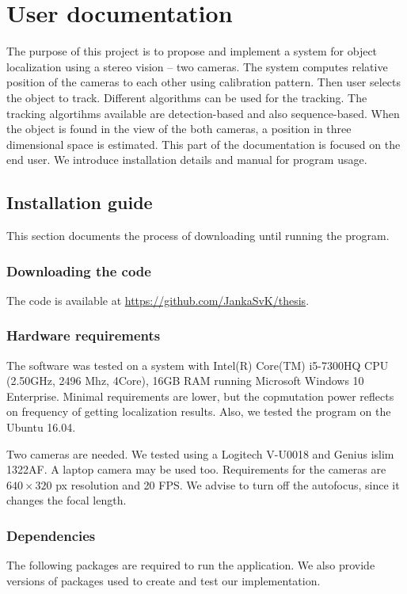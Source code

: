 \chapter{User documentation}
The purpose of this project is to propose and implement a system for object
localization using a stereo vision -- two cameras. The system computes relative
position of the cameras to each other using calibration pattern.  Then user
selects the object to track. Different algorithms can be used for the tracking.
The tracking algortihms available are detection-based and also sequence-based.
When the object is found in the view of the both cameras, a position in three
dimensional space is estimated. 
This part of the documentation is focused on the end user. We introduce
installation details and manual for program usage.

\section{Installation guide}
This section documents the process of downloading until running the program.

\subsection{Downloading the code}
The code is available at \url{https://github.com/JankaSvK/thesis}.

\subsection{Hardware requirements}
The software was tested on a system with Intel(R) Core(TM) i5-7300HQ CPU
(2.50GHz, 2496 Mhz, 4Core), 16GB RAM running Microsoft Windows 10 Enterprise.
Minimal requirements are lower, but the copmutation power reflects on frequency
of getting localization results. Also, we tested the program on the Ubuntu
16.04.

Two cameras are needed. We tested using a Logitech V-U0018 and Genius
islim 1322AF. A laptop camera may be used too. Requirements for the cameras
are $640\times320$ px resolution and 20 FPS. We advise to turn off the
autofocus, since it changes the focal length.

\subsection{Dependencies}
The following packages are required to run the application. We also provide
versions of packages used to create and test our implementation.


